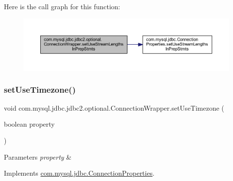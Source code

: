 Here is the call graph for this function\+:
\nopagebreak
\begin{figure}[H]
\begin{center}
\leavevmode
\includegraphics[width=350pt]{classcom_1_1mysql_1_1jdbc_1_1jdbc2_1_1optional_1_1_connection_wrapper_a9eadd4adb9ecde242f0656084f31f8c7_cgraph}
\end{center}
\end{figure}
\mbox{\label{classcom_1_1mysql_1_1jdbc_1_1jdbc2_1_1optional_1_1_connection_wrapper_aceb697ff05de0e9bcd43256ff2a7d47a}} 
\subsubsection{\texorpdfstring{set\+Use\+Timezone()}{setUseTimezone()}}
{\footnotesize\ttfamily void com.\+mysql.\+jdbc.\+jdbc2.\+optional.\+Connection\+Wrapper.\+set\+Use\+Timezone (\begin{DoxyParamCaption}\item[{boolean}]{property }\end{DoxyParamCaption})}


\begin{DoxyParams}{Parameters}
{\em property} & \\
\hline
\end{DoxyParams}


Implements \mbox{\hyperlink{interfacecom_1_1mysql_1_1jdbc_1_1_connection_properties_a7f57a800fefe86a58c1ddfe7fd7d8ef2}{com.\+mysql.\+jdbc.\+Connection\+Properties}}.

